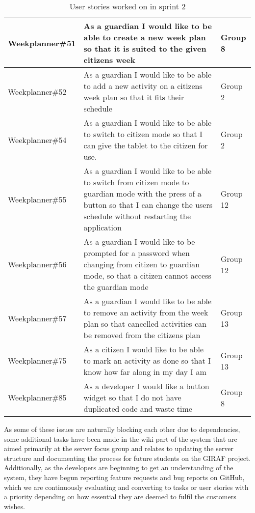 \begin{table}[H]
\begin{tabular}{|p{2.8cm}|p{7cm}|p{2cm}|}
    Weekplanner\#51 & As a guardian I would like to be able to create a new week plan so that it is suited to the given citizens week                                                                          & Group 8             \\ \hline
    Weekplanner\#52 & As a guardian I would like to be able to add a new activity on a citizens week plan so that it fits their schedule                                                                       & Group 2             \\ \hline
    Weekplanner\#54 & As a guardian I would like to be able to switch to citizen mode so that I can give the tablet to the citizen for use.                                                                    & Group 2             \\ \hline
    Weekplanner\#55 & As a guardian I would like to be able to switch from citizen mode to guardian mode with the press of a button so that I can change the users schedule without restarting the application & Group 12            \\ \hline
    Weekplanner\#56 & As a guardian I would like to be prompted for a password when changing from citizen to guardian mode, so that a citizen cannot access the guardian mode                                  & Group 12            \\ \hline
    Weekplanner\#57 & As a guardian I would like to be able to remove an activity from the week plan so that cancelled activities can be removed from the citizens plan                                        & Group 13            \\ \hline
    Weekplanner\#75 & As a citizen I would like to be able to mark an activity as done so that I know how far along in my day I am                                                                             & Group 13            \\ \hline
    Weekplanner\#85 & As a developer I would like a button widget so that I do not have duplicated code and waste time                                                                                         & Group 8             \\ \hline
    \end{tabular}
    \caption{User stories worked on in sprint 2}
\end{table}

\noindent 
As some of these issues are naturally blocking each other due to dependencies, some additional tasks have been made in the wiki part of the system that are aimed primarily at the server focus group and relates to updating the server structure and documenting the process for future students on the GIRAF project.
Additionally, as the developers are beginning to get an understanding of the system, they have begun reporting feature requests and bug reports on GitHub, which we are continuously evaluating and converting to tasks or user stories with a priority depending on how essential they are deemed to fulfil the customers wishes.
